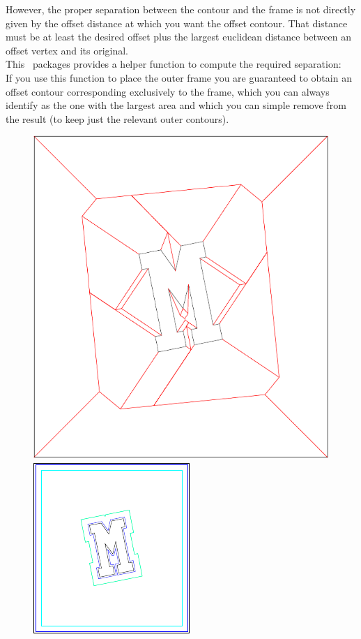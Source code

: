 However, the proper separation between the contour and the frame is not directly given by the offset distance at which you want the offset contour. That distance must be at least the desired offset plus the largest euclidean distance between an offset vertex and its original.\\
This \cgal\ packages provides a helper function to compute the required separation:
\\
If you use this function to place the outer frame you are guaranteed to obtain an offset contour corresponding exclusively to the frame, which you can always identify as the one with the largest area and which you can simple remove from the result (to keep just the relevant outer contours).

\begin{figure}[htbp]
\begin{ccTexOnly}
\begin{center}
\includegraphics{Straight_skeleton_2/exterior_skeleton} %
\end{center}
\begin{center}
\includegraphics{Straight_skeleton_2/exterior_offset} %
\end{center}
\end{ccTexOnly}


\end{figure}
